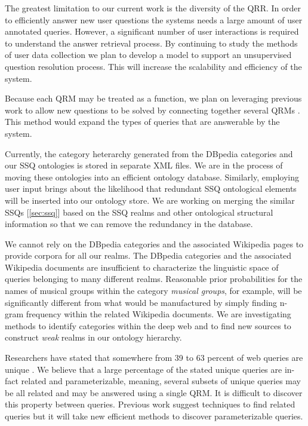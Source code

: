 The greatest limitation to our current work is the diversity of the
QRR.  In order to efficiently answer new user questions the systems
needs a large amount of user annotated queries.  However, a
significant number of user interactions is required to understand the
answer retrieval process.  By continuing to study the methods of user
data collection we plan to develop a model to support an unsupervised
question resolution process.  This will increase the scalability and
efficiency of the system.

Because each QRM may be treated as a function, we plan on leveraging
previous work to allow new questions to be solved by connecting
together several QRMs \cite{morpheus1, transformscout}.  This method
would expand the types of queries that are answerable by the system.

Currently, the category heterarchy generated from the DBpedia
categories and our SSQ ontologies is stored in separate XML files. We
are in the process of moving these ontologies into an efficient
ontology database. Similarly, employing user input brings about the
likelihood that redundant SSQ ontological elements will be inserted
into our ontology store. We are working on merging the similar SSQs
[\ref{sec:ssq}] based on the SSQ realms and other ontological
structural information so that we can remove the redundancy in the
database.

We cannot rely on the DBpedia categories and the associated Wikipedia
pages to provide corpora for all our realms.  The DBpedia categories
and the associated Wikipedia documents are insufficient to
characterize the linguistic space of queries belonging to many
different realms.  Reasonable prior probabilities for the names of
musical groups within the category \emph{musical groups}, for example,
will be significantly different from what would be manufactured by
simply finding n-gram frequency within the related Wikipedia
documents. We are investigating methods to identify categories within
the deep web and to find new sources to construct \textit{weak} realms
in our ontology hierarchy.


Researchers have stated that somewhere from 39 to 63 percent of web
queries are unique \cite{1277770,331405,621942}.  We believe that a
large percentage of the stated unique queries are in-fact related and
parameterizable, meaning, several subsets of unique queries may be all
related and may be answered using a single QRM.  It is difficult to
discover this property between queries.  Previous work suggest
techniques to find related queries but it will take new efficient
methods to discover parameterizable queries.

